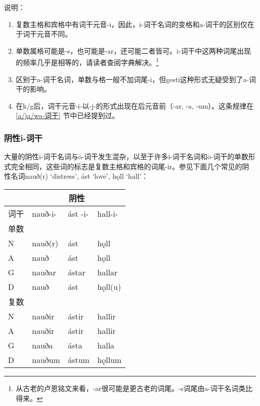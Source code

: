 说明：

\begin{enumerate}
  \item
        复数主格和宾格中有词干元音-i，因此，i-词干名词的变格和a-词干的区别仅在于词干元音不同。
  \item
        单数属格可能是-s，也可能是-ar，还可能二者皆可。i-词干中这两种词尾出现的频率几乎是相等的，请读者查阅字典解决。\footnote{从古老的卢恩铭文来看，-ar很可能是更古老的词尾。-s词尾由a-词干名词类比得来。}
  \item
        区别于a-词干名词，单数与格一般不加词尾-i，但gesti这种形式无疑受到了a-词干的影响。
  \item
        在k/g后，词干元音-i-以-j-的形式出现在后元音前（-ar, -a,
        -um）。这条规律在 \ref{a/ja/wa-词干} 节中已经提到过。
\end{enumerate}

\subsubsection{阴性i-词干}

大量的阴性i-词干名词与ō-词干发生混杂，以至于许多i-词干名词和ō-词干的单数形式完全相同，这些词的标志是复数主格和宾格的词尾-ir。参见下面几个常见的阴性名词nauð(r)
`distress', ást `love', hǫll `hall'：

\begin{longtable}{llll}
  \toprule
       & \multicolumn{3}{c}{\textbf{阴性}}                     \\
  \midrule
  \endhead
  \bottomrule
  \endfoot
  词干 & nauð-i-                           & ást -i- & hall-i- \\
  单数 &                                   &         &         \\
  N    & nauð(r)                           & ást     & hǫll    \\
  A    & nauð                              & ást     & hǫll    \\
  G    & nauðar                            & ástar   & hallar  \\
  D    & nauð                              & ást     & hǫll(u) \\
  复数 &                                   &         &         \\
  N    & nauðir                            & ástir   & hallir  \\
  A    & nauðir                            & ástir   & hallir  \\
  G    & nauða                             & ásta    & halla   \\
  D    & nauðum                            & ástum   & hǫllum  \\
\end{longtable}

